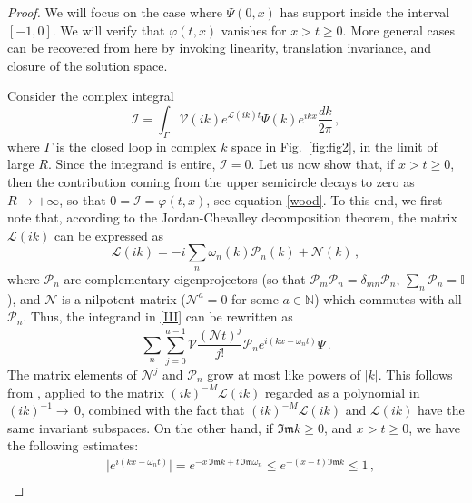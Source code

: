 \documentclass[prl, amsfonts, amssymb, amsmath, nofootinbib,reprint, showkeys, twoside,notitlepage]{revtex4-2}
\theoremstyle{definition}
\theoremstyle{theorem}
\theoremstyle{corollary}
\begin{document}
\begin{proof}
We will focus on the case where $\Psi(0,x)$ has support inside the interval $[-1,0]$. We will verify that $\varphi(t,x)$ vanishes for $x>t \geq 0$. More general cases can be recovered from here by invoking linearity, translation invariance, and closure of the solution space.

Consider the complex integral
\begin{equation}\label{III}
\mathcal{I}=\int_\Gamma \mathcal{V}(ik) e^{\mathcal{L}(ik)t}\Psi(k)e^{ikx} \dfrac{dk}{2\pi} \, ,
\end{equation}
where $\Gamma$ is the closed loop in complex $k$ space in Fig.\ \ref{fig:fig2}, in the limit of large $R$. Since the integrand is entire, $\mathcal{I}=0$. Let us now show that, if $x>t \geq 0$, then the contribution coming from the upper semicircle decays to zero as $R\rightarrow +\infty$, so that $0=\mathcal{I}=\varphi(t,x)$, see equation \eqref{wood}. To this end, we first note that, according to the Jordan-Chevalley decomposition theorem, the matrix $\mathcal{L}(ik)$ can be expressed as 
\begin{equation}
\mathcal{L}(ik)=-i\sum_n \omega_n(k)\mathcal{P}_n(k)+\mathcal{N}(k) \, ,
\end{equation}
where $\mathcal{P}_n$ are complementary eigenprojectors (so that $\mathcal{P}_m\mathcal{P}_n=\delta_{mn}\mathcal{P}_n$, $\sum_n \mathcal{P}_n=\mathbb{I}$), and $\mathcal{N}$ is a nilpotent matrix ($\mathcal{N}^{a}{=}0$ for some $a \in \mathbb{N}$) which commutes with all $\mathcal{P}_n$. Thus, the integrand in \eqref{III} can be rewritten as
\begin{equation}\label{brutale}
\sum_n\sum_{j=0}^{a-1}\mathcal{V}  \dfrac{(\mathcal{N} t)^j}{j!} \mathcal{P}_n e^{i(kx-\omega_n t)} \Psi  \, .
\end{equation}
The matrix elements of $\mathcal{N}^j$ and $\mathcal{P}_n$ grow at most like powers of $|k|$. 
This follows from \cite[Chapter 2, eqs. (1.21) and (1.26)]{Kato_book}, applied to the matrix $(ik)^{-M} \mathcal{L}(ik)$ regarded as a polynomial in $(ik)^{-1} \! {\rightarrow} \, 0$, combined with the fact that $(ik)^{-M} \mathcal{L}(ik)$ and $\mathcal{L}(ik)$ have the same invariant subspaces. 
On the other hand, if $\mathfrak{Im} k \geq 0$, and $x>t \geq 0$, we have the following estimates:
\begin{equation}\label{tweve}
\begin{split}
& \big|e^{i(kx-\omega_nt)}\big|= e^{-x \, \mathfrak{Im}k+t \, \mathfrak{Im}\omega_n} \leq e^{-(x-t)\mathfrak{Im}k} \leq 1  \, , \\

\end{split}
\end{equation}
\end{proof}
\end{document}
